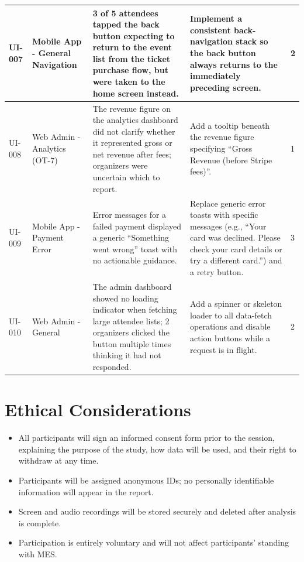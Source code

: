 \documentclass[12pt, titlepage]{article}
\begin{document}
\begin{longtable}{|p{1.5cm}|p{3cm}|p{4cm}|p{3cm}|p{1.5cm}|}
\hline
UI-007 & Mobile App - General Navigation & 3 of 5 attendees tapped the back button expecting to return to the event list from the ticket purchase flow, but were taken to the home screen instead. & Implement a consistent back-navigation stack so the back button always returns to the immediately preceding screen. & 2 \\
\hline
UI-008 & Web Admin - Analytics (OT-7) & The revenue figure on the analytics dashboard did not clarify whether it represented gross or net revenue after fees; organizers were uncertain which to report. & Add a tooltip beneath the revenue figure specifying ``Gross Revenue (before Stripe fees)''. & 1 \\
\hline
UI-009 & Mobile App - Payment Error & Error messages for a failed payment displayed a generic ``Something went wrong'' toast with no actionable guidance. & Replace generic error toasts with specific messages (e.g., ``Your card was declined. Please check your card details or try a different card.'') and a retry button. & 3 \\
\hline
UI-010 & Web Admin - General & The admin dashboard showed no loading indicator when fetching large attendee lists; 2 organizers clicked the button multiple times thinking it had not responded. & Add a spinner or skeleton loader to all data-fetch operations and disable action buttons while a request is in flight. & 2 \\
\hline
\end{longtable}


\section{Ethical Considerations}


\begin{itemize}
    \item All participants will sign an informed consent form prior to the session, explaining the purpose of the study, how data will be used, and their right to withdraw at any time.
    \item Participants will be assigned anonymous IDs; no personally identifiable information will appear in the report.
    \item Screen and audio recordings will be stored securely and deleted after analysis is complete.
    \item Participation is entirely voluntary and will not affect participants' standing with MES.
\end{itemize}
\end{document}
